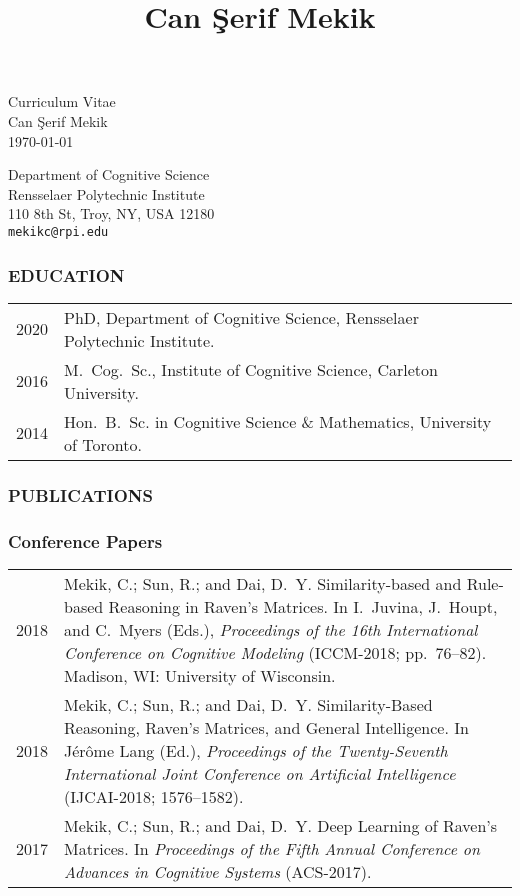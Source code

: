 \documentclass[12pt, letterpaper]{article}
\title{Can \c Serif Mekik}
\date{}
\begin{document}
\thispagestyle{empty}
\begin{center}
Curriculum Vitae\\
{\large Can \c Serif Mekik}\\
\today
\end{center}

\noindent Department of Cognitive Science\\
Rensselaer Polytechnic Institute\\
110 8th St, Troy, NY, USA 12180\\
\texttt{mekikc@rpi.edu}

\subsubsection*{EDUCATION}

\begin{longtable}{p{}p{}}
2020 & PhD, Department of Cognitive Science, Rensselaer Polytechnic Institute.\\
2016 & M.\ Cog.\ Sc., Institute of Cognitive Science, Carleton University.\\
2014 & Hon.\ B.\ Sc. in Cognitive Science \& Mathematics, University of Toronto.
\end{longtable}

\subsubsection*{PUBLICATIONS}

\subsubsection*{Conference Papers}

\begin{longtable}{p{}p{}}
2018 & \noindent\hangindent=1cm Mekik, C.; Sun, R.; and Dai, D.\ Y. Similarity-based and Rule-based Reasoning in Raven's Matrices. In I.\ Juvina, J.\ Houpt, and C.\ Myers (Eds.), \emph{Proceedings of the 16th International Conference on Cognitive Modeling} (ICCM-2018; pp.\ 76--82). Madison, WI: University of Wisconsin.\\

2018 & \noindent\hangindent=1cm Mekik, C.; Sun, R.; and Dai, D.\ Y. Similarity-Based Reasoning, Raven's Matrices, and General Intelligence. In Jérôme Lang (Ed.), \emph{Proceedings of the Twenty-Seventh International Joint Conference on Artificial Intelligence} (IJCAI-2018; 1576--1582).\\

2017 & \noindent\hangindent=1cm Mekik, C.; Sun, R.; and Dai, D.\ Y. Deep Learning of Raven's Matrices. In \emph{Proceedings of the Fifth Annual Conference on Advances in Cognitive Systems} (ACS-2017).
\end{longtable}
\end{document}
